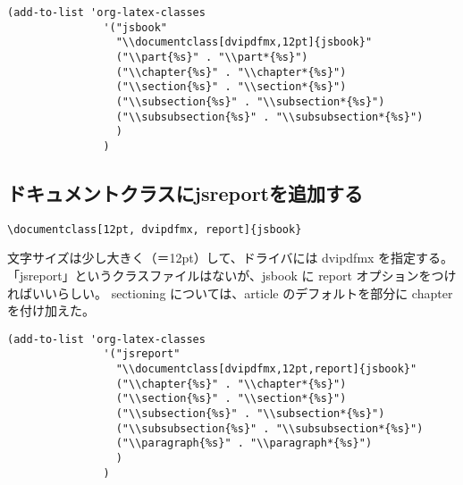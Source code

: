 \documentclass[dvipdfmx,12pt]{jsarticle}
\begin{document}
\lstset{language=Lisp,label= ,caption= ,numbers=none}
\begin{lstlisting}
(add-to-list 'org-latex-classes
               '("jsbook"
                 "\\documentclass[dvipdfmx,12pt]{jsbook}"
                 ("\\part{%s}" . "\\part*{%s}")
                 ("\\chapter{%s}" . "\\chapter*{%s}")
                 ("\\section{%s}" . "\\section*{%s}")
                 ("\\subsection{%s}" . "\\subsection*{%s}")
                 ("\\subsubsection{%s}" . "\\subsubsection*{%s}")
                 )
               )
\end{lstlisting}

\subsection{ドキュメントクラスにjsreportを追加する}
\label{sec-4-5}

\lstset{language=[LaTeX]TeX,label= ,caption= ,numbers=none}
\begin{lstlisting}
\documentclass[12pt, dvipdfmx, report]{jsbook}
\end{lstlisting}

文字サイズは少し大きく（＝12pt）して、ドライバには dvipdfmx を指定する。
「jsreport」というクラスファイルはないが、jsbook に report オプションをつければいいらしい。
sectioning については、article のデフォルトを部分に chapter を付け加えた。

\lstset{language=[LaTeX]TeX,label= ,caption= ,numbers=none}
\begin{lstlisting}
(add-to-list 'org-latex-classes
               '("jsreport"
                 "\\documentclass[dvipdfmx,12pt,report]{jsbook}"
                 ("\\chapter{%s}" . "\\chapter*{%s}")
                 ("\\section{%s}" . "\\section*{%s}")
                 ("\\subsection{%s}" . "\\subsection*{%s}")
                 ("\\subsubsection{%s}" . "\\subsubsection*{%s}")
                 ("\\paragraph{%s}" . "\\paragraph*{%s}")
                 )
               )
\end{lstlisting}
\end{document}
